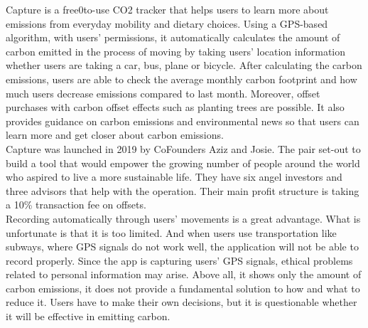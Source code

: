 \documentclass[11pt, conference]{IEEEtran}
\begin{document}
\begin{enumerate}[label=\arabic*]
\begin{enumerate}[label=\alph*]
            Capture is a free0to-use CO2 tracker that helps users to learn more about emissions from everyday mobility and dietary choices. Using a GPS-based algorithm, with users’ permissions, it automatically calculates the amount of carbon emitted in the process of moving by taking users’ location information whether users are taking a car, bus, plane or bicycle. After calculating the carbon emissions, users are able to check the average monthly carbon footprint and how much users decrease emissions compared to last month. Moreover, offset purchases with carbon offset effects such as planting trees are possible. It also provides guidance on carbon emissions and environmental news so that users can learn more and get closer about carbon emissions. \\
            Capture was launched in 2019 by CoFounders Aziz and Josie. The pair set-out to build a tool that would empower the growing number of people around the world who aspired to live a more sustainable life. They have six angel investors and three advisors that help with the operation. Their main profit structure is taking a 10\% transaction fee on offsets.\\
            Recording automatically through users’ movements is a great advantage. What is unfortunate is that it is too limited. And when users use transportation like subways, where GPS signals do not work well, the application will not be able to record properly. Since the app is capturing users’ GPS signals, ethical problems related to personal information may arise. Above all, it shows only the amount of carbon emissions, it does not provide a fundamental solution to how and what to reduce it. Users have to make their own decisions, but it is questionable whether it will be effective in emitting carbon.
        \end{enumerate}
\end{enumerate}
\end{document}
